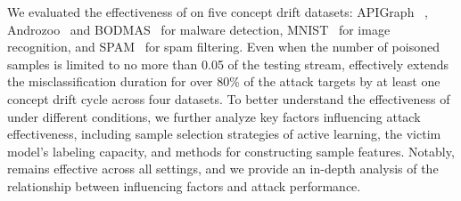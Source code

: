We evaluated the effectiveness of \pandora on five concept drift datasets: APIGraph~\cite{2020-CCS-APIGraph} , Androzoo~\cite{2016-Androzoo} and BODMAS~\cite{2021-PE-malware-dataset} for malware detection, MNIST~\cite{2017-MINIST-dataset} for image recognition, and SPAM~\cite{2010-Spam-Emali-dataset} for spam filtering.
Even when the number of poisoned samples is limited to no more than 0.05 of the testing stream, \pandora effectively extends the misclassification duration for over 80\% of the attack targets by at least one concept drift cycle across four datasets.
To better understand the effectiveness of \pandora under different conditions, we further analyze key factors influencing attack effectiveness, including sample selection strategies of active learning, the victim model's labeling capacity, and methods for constructing sample features.
Notably, \pandora remains effective across all settings, and we provide an in-depth analysis of the relationship between influencing factors and attack performance.

